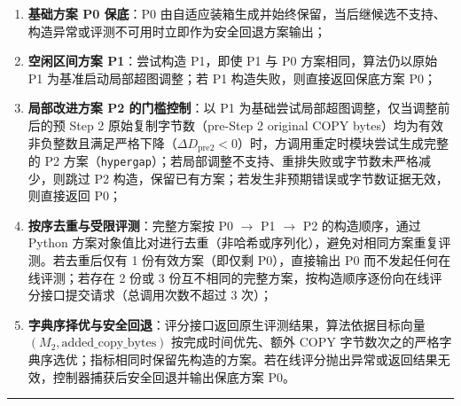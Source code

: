 \documentclass[anonymous,withtoc]{gmcm2026}
\providecommand{\tightlist}{\setlength{\itemsep}{0pt}\setlength{\parskip}{0pt}}
\begin{document}
\begin{enumerate}
\def\labelenumi{\arabic{enumi}.}
\tightlist
\item
  \textbf{基础方案 P0 保底}：P0 由自适应装箱生成并始终保留，当后继候选不支持、构造异常或评测不可用时立即作为安全回退方案输出；
\item
  \textbf{空闲区间方案 P1}：尝试构造 P1，即使 P1 与 P0 方案相同，算法仍以原始 P1 为基准启动局部超图调整；若 P1 构造失败，则直接返回保底方案 P0；
\item
  \textbf{局部改进方案 P2 的门槛控制}：以 P1 为基础尝试局部超图调整，仅当调整前后的预 Step 2 原始复制字节数（pre-Step 2 original COPY bytes）均为有效非负整数且满足严格下降（\(\Delta D_{\mathrm{pre2}} < 0\)）时，方调用重定时模块尝试生成完整的 P2 方案（\texttt{hypergap}）；若局部调整不支持、重排失败或字节数未严格减少，则跳过 P2 构造，保留已有方案；若发生非预期错误或字节数证据无效，则直接返回 P0；
\item
  \textbf{按序去重与受限评测}：完整方案按 P0 \(\to\) P1 \(\to\) P2 的构造顺序，通过 Python 方案对象值比对进行去重（非哈希或序列化），避免对相同方案重复评测。若去重后仅有 1 份有效方案（即仅剩 P0），直接输出 P0 而不发起任何在线评测；若存在 2 份或 3 份互不相同的完整方案，按构造顺序逐份向在线评分接口提交请求（总调用次数不超过 3 次）；
\item
  \textbf{字典序择优与安全回退}：评分接口返回原生评测结果，算法依据目标向量 \((M_2,\allowbreak \text{added\_copy\_bytes})\) 按完成时间优先、额外 COPY 字节数次之的严格字典序选优；指标相同时保留先构造的方案。若在线评分抛出异常或返回结果无效，控制器捕获后安全回退并输出保底方案 P0。
\end{enumerate}

\FloatBarrier
\par{}\begingroup\normalsize
\captionsetup{type=algorithm,position=top,justification=raggedright,singlelinecheck=false,labelfont=bf}
\label{alg:p2-adaptive-hypergap}
\nopagebreak\hrule\nopagebreak
\end{document}

